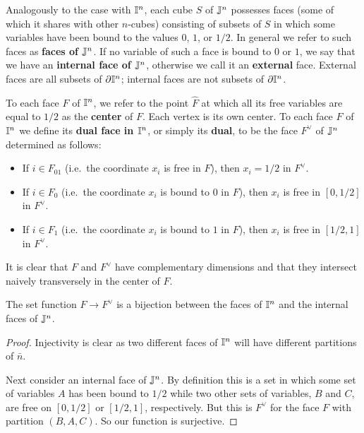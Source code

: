 Analogously to the case with $\mathbb{I}^n$, each cube $S$ of $\mathbb{J}^n$ possesses faces (some of which it shares with other $n$-cubes) consisting of subsets of $S$ in which some variables have been bound to the values $0$, $1$, or $1/2$.
In general we refer to such faces as \textbf{faces of $\mathbb{J}^n$}.
If no variable of such a face is bound to $0$ or $1$, we say that we have an \textbf{internal face of $\mathbb{J}^n$}, otherwise we call it an \textbf{external} face.
External faces are all subsets of $\partial \mathbb{I}^n$; internal faces are not subsets of $\partial \mathbb{I}^n$.

To each face $F$ of $\mathbb{I}^n$, we refer to the point $\hat F$ at which all its free variables are equal to $1/2$ as the \textbf{center} of $F$.
Each vertex is its own center.
To each face $F$ of $\mathbb{I}^n$ we define its \textbf{dual face in $\mathbb{I}^n$}, or simply its \textbf{dual}, to be the face $F^\vee$ of $\mathbb{J}^n$ determined as follows:
\begin{itemize}
	\item If $i \in F_{01}$ (i.e.\ the coordinate $x_i$ is free in $F$), then $x_i = 1/2$ in $F^\vee$.

	\item If $i \in F_0$ (i.e.\ the coordinate $x_i$ is bound to $0$ in $F$), then $x_i$ is free in $[0,1/2]$ in $F^\vee$.

	\item If $i \in F_1$ (i.e.\ the coordinate $x_i$ is bound to $1$ in $F$), then $x_i$ is free in $[1/2,1]$ in $F^\vee$.
\end{itemize}

It is clear that $F$ and $F^\vee$ have complementary dimensions and that they intersect naively transversely in the center of $F$.

\begin{lemma}
	The set function $F \to F^\vee$ is a bijection between the faces of $\mathbb{I}^n$ and the internal faces of $\mathbb{J}^n$.
\end{lemma}

\begin{proof}
	Injectivity is clear as two different faces of $\mathbb{I}^n$ will have different partitions of $\bar n$.

	Next consider an internal face of $\mathbb{J}^n$.
	By definition this is a set in which some set of variables $A$ has been bound to $1/2$ while two other sets of variables, $B$ and $C$, are free on $[0,1/2]$ or $[1/2,1]$, respectively.
	But this is $F^\vee$ for the face $F$ with partition $(B,A,C)$.
	So our function is surjective.
\end{proof}

